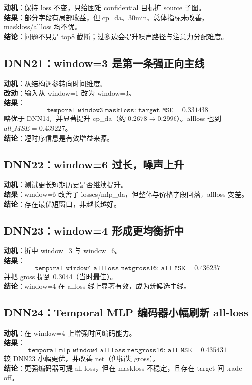 \documentclass[UTF8]{ctexart}
\begin{document}
\textbf{动机}：保持 loss 不变，只给困难 confidential 目标扩 source 子图。\\
\textbf{结果}：部分字段有局部收益，但 cp\_da、30min、总体指标未改善，maskloss/allloss 均不优。\\
\textbf{结论}：问题不只是 top8 截断；过多边会提升噪声路径与注意力分配难度。

\subsection{DNN21：window=3 是第一条强正向主线}

\textbf{动机}：从结构调参转向时间维度。\\
\textbf{改动}：输入从 window=1 改为 window=3。\\
\textbf{结果}：
\[
\texttt{temporal\_window3\_maskloss: target\_MSE}=0.331438
\]
略优于 DNN14，并显著提升 cp\_da（约 \(0.2678\rightarrow0.2996\)）。allloss 也到 \(all\_MSE=0.439227\)。\\
\textbf{结论}：短时序信息是有效增益来源。

\subsection{DNN22：window=6 过长，噪声上升}

\textbf{动机}：测试更长短期历史是否继续提升。\\
\textbf{结果}：window=6 改善了 losses/mlp\_da，但整体与价格字段回落，allloss 变差。\\
\textbf{结论}：存在最优短窗口，非越长越好。

\subsection{DNN23：window=4 形成更均衡折中}

\textbf{动机}：折中 window=3 与 window=6。\\
\textbf{结果}：
\[
\texttt{temporal\_window4\_allloss\_netgross16: all\_MSE}=0.436237
\]
并把 gross 提到 0.3044（当时最佳）。\\
\textbf{结论}：window=4 在 allloss 线上显著有效，成为新候选主线。

\subsection{DNN24：Temporal MLP 编码器小幅刷新 all-loss}

\textbf{动机}：在 window=4 上增强时间编码能力。\\
\textbf{结果}：
\[
\texttt{temporal\_mlp\_window4\_allloss\_netgross16: all\_MSE}=0.435431
\]
较 DNN23 小幅更优，并改善 net（但损失 gross）。\\
\textbf{结论}：更强编码器可提 all-loss，但在 maskloss 不稳定，且存在 target 间 trade-off。
\end{document}

